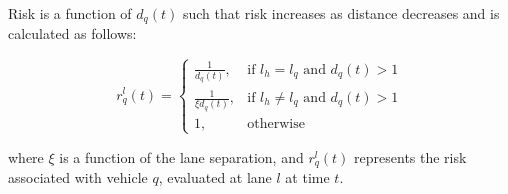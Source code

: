 \documentclass[letterpaper, 10 pt, conference]{ieeeconf}  %
\newcommand\NB[1]{$\spadesuit$\footnote{NB: #1}}
\newcommand\RP[1]{$\clubsuit$\footnote{RP: #1}}
\begin{document}



Risk is a function of $d_q(t)$ such that risk increases as distance decreases and is calculated as follows:

\begin{equation}
    r_{q}^{l}(t) =
    \begin{cases}
    \frac{1}{d_{q}(t)},  & \text{if } l_h=l_q \text{ and } d_{q}(t) > 1  \\
    \frac{1}{\xi d_{q}(t)},  & \text{if } l_h\neq l_q \text{ and } d_{q}(t) > 1  \\
        1,                     & \text{otherwise}  
    \end{cases}
\end{equation}

where $\xi$ is a function of the lane separation, and $r_{q}^{l}(t)$ represents the risk associated with vehicle $q$, evaluated at lane $l$ at time $t$.

\end{document}
